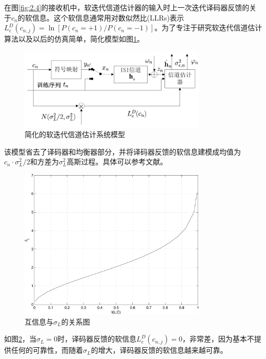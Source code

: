 在图\ref{fig:2.4}的接收机中，软迭代信道估计器的输入时上一次迭代译码器反馈的关于$c_n$的软信息。这个软信息通常用对数似然比(LLRs)表示$L_e^D(c_{n,j})=\ln[P(c_n=+1)/P(c_n=-1)]$。为了专注于研究软迭代信道估计算法以及以后的仿真简单，简化模型如图\ref{fig:4.1}。
\begin{figure}[htb]
  \begin{center}
    \includegraphics[width=0.8\textwidth]{images/channel.pdf}
  \end{center}
  \caption{简化的软迭代信道估计系统模型}
  \label{fig:4.1}
\end{figure}
该模型省去了译码器和均衡器部分，并将译码器反馈的软信息建模成均值为$c_n\cdot\sigma_L^2/2$和方差为$\sigma_L^2$高斯过程。具体可以参考文献。
\begin{figure}[htb]
  \begin{center}
    \includegraphics[width=0.8\textwidth]{images/relation.pdf}
  \end{center}
  \caption{互信息与$\sigma_L$的关系图}
  \label{fig:4.2}
\end{figure}
如图\ref{fig:4.2}，当$\sigma_L=0$时，译码器反馈的软信息$L_e^D(c_{n,j})=0$，非常差，因为基本不提供任何的可靠性，而随着$\sigma_L$的增大，译码器反馈的软信息越来越可靠。

